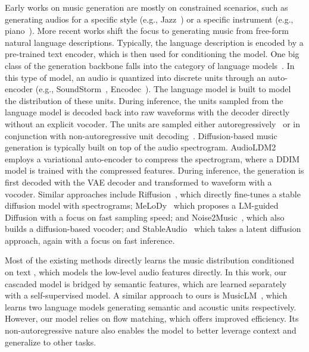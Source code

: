 Early works on music generation are mostly on constrained scenarios, such as generating audios for a specific style (e.g., Jazz~\cite{Hung2019ImprovingAJ}) or a specific instrument (e.g., piano~\cite{Hawthorne2018EnablingFP}). More recent works shift the focus to generating music from free-form natural language descriptions. Typically, the language description is encoded by a pre-trained text encoder, which is then used for conditioning the model. One big class of the generation backbone falls into the category of language models~\cite{musiclm,musicgen}. In this type of model, an audio is quantized into discrete units through an auto-encoder (e.g., SoundStorm~\cite{zeghidour2021soundstream}, Encodec~\cite{defossez2022highfi}). The language model is built to model the distribution of these units. During inference, the units sampled from the language model is decoded back into raw waveforms with the decoder directly without an explicit vocoder. The units are sampled either autoregressively~\cite{musicgen,musiclm,yang2023uniaudio} or in conjunction with non-autoregressive unit decoding~\cite{ziv2024masked}.  Diffusion-based music generation is typically built on top of the audio spectrogram. AudioLDM2~\cite{audio-ldm2} employs a variational auto-encoder to compress the spectrogram, where a DDIM~\cite{song2020denoising} model is trained with the compressed features. During inference, the generation is first decoded with the VAE decoder and transformed to waveform with a vocoder.  Similar approaches include Riffusion~\cite{forsgren2022riffusion}, which directly fine-tunes a stable diffusion model with spectrograms; MeLoDy~\cite{melody} which proposes a LM-guided Diffusion with a focus on fast sampling speed; and Noise2Music~\cite{noise2music}, which also builds a diffusion-based vocoder; and StableAudio~\cite{evans2024fast} which takes a latent diffusion approach, again with a focus on fast inference. 

Most of the existing methods directly learns the music distribution conditioned on text , which models the low-level audio features directly. In this work, our cascaded model is bridged by semantic features, which are learned separately with a self-supervised model. A similar approach to ours is MusicLM~\cite{musiclm}, which learns two language models generating semantic and acoustic units respectively. 
However, our model relies on flow matching, which offers improved efficiency. Its non-autoregressive nature also enables the model to better leverage context and generalize to other tasks.

